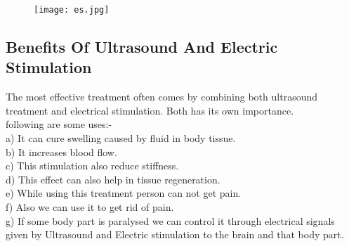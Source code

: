 \documentclass[12pt]{article}
\begin{document}
\begin{figure}[h]
\centering
\texttt{[image: es.jpg]}
\end{figure}

\subsection{Benefits Of Ultrasound And Electric Stimulation}

The most effective treatment often comes by combining both ultrasound treatment and electrical stimulation. Both has its own importance.\\
following are some uses:-\\

a) It can cure swelling caused by fluid in body tissue. \\

b) It increases blood flow.\\

c) This stimulation also reduce stiffness.\\

d) This effect can also help in tissue regeneration.\\

e) While using this treatment person can not get pain.\\

f) Also we can use it to get rid of pain.\\

g) If some body part is paralysed we can control it through electrical signals given by Ultrasound and Electric stimulation to the brain and that body part.
\end{document}
